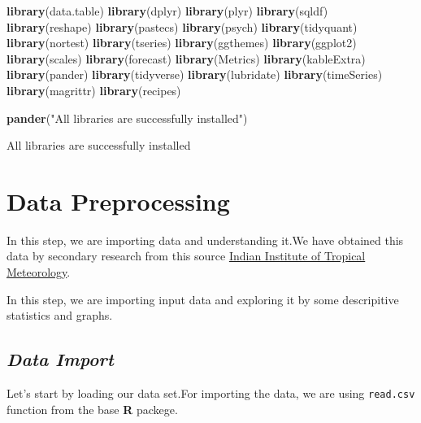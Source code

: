 \documentclass[12pt,openany]{book}
\newenvironment{Shaded}{\begin{snugshade}}{\end{snugshade}}
\newcommand{\KeywordTok}[1]{\textcolor[rgb]{0.13,0.29,0.53}{\textbf{#1}}}
\newcommand{\NormalTok}[1]{#1}
\newcommand{\StringTok}[1]{\textcolor[rgb]{0.31,0.60,0.02}{#1}}
\begin{document}
\begin{Shaded}
\begin{Highlighting}[]
\KeywordTok{library}\NormalTok{(data.table)}
\KeywordTok{library}\NormalTok{(dplyr)}
\KeywordTok{library}\NormalTok{(plyr)}
\KeywordTok{library}\NormalTok{(sqldf)}
\KeywordTok{library}\NormalTok{(reshape)}
\KeywordTok{library}\NormalTok{(pastecs)}
\KeywordTok{library}\NormalTok{(psych)}
\KeywordTok{library}\NormalTok{(tidyquant)}
\KeywordTok{library}\NormalTok{(nortest)}
\KeywordTok{library}\NormalTok{(tseries)}
\KeywordTok{library}\NormalTok{(ggthemes)}
\KeywordTok{library}\NormalTok{(ggplot2)}
\KeywordTok{library}\NormalTok{(scales)}
\KeywordTok{library}\NormalTok{(forecast)}
\KeywordTok{library}\NormalTok{(Metrics)}
\KeywordTok{library}\NormalTok{(kableExtra)}
\KeywordTok{library}\NormalTok{(pander)}
\KeywordTok{library}\NormalTok{(tidyverse)}
\KeywordTok{library}\NormalTok{(lubridate)}
\KeywordTok{library}\NormalTok{(timeSeries)}
\KeywordTok{library}\NormalTok{(magrittr)}
\KeywordTok{library}\NormalTok{(recipes)}

\KeywordTok{pander}\NormalTok{(}\StringTok{"All libraries are successfully installed"}\NormalTok{)}
\end{Highlighting}
\end{Shaded}

All libraries are successfully installed

\hypertarget{data-preprocessing-1}{%
\section{Data Preprocessing}\label{data-preprocessing-1}}

In this step, we are importing data and understanding it.We have obtained this data by secondary research from this source \href{https://tropmet.res.in/static_pages.php?page_id=53}{Indian Institute of Tropical Meteorology}.

In this step, we are importing input data and exploring it by some descripitive statistics and graphs.

\hypertarget{data-import}{%
\subsection{\texorpdfstring{\emph{Data Import}}{Data Import}}\label{data-import}}

Let's start by loading our data set.For importing the data, we are using \texttt{read.csv} function from the base \textbf{R} packege.
\end{document}

